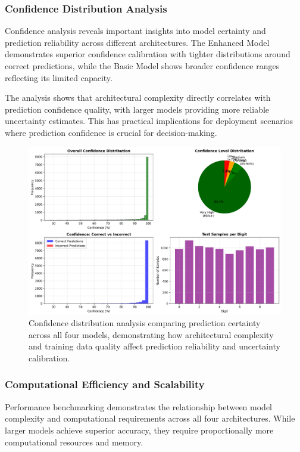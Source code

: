 \documentclass[11pt,a4paper]{report}
\begin{document}
\subsubsection{Confidence Distribution Analysis}

Confidence analysis reveals important insights into model certainty and prediction reliability across different architectures. The Enhanced Model demonstrates superior confidence calibration with tighter distributions around correct predictions, while the Basic Model shows broader confidence ranges reflecting its limited capacity.

The analysis shows that architectural complexity directly correlates with prediction confidence quality, with larger models providing more reliable uncertainty estimates. This has practical implications for deployment scenarios where prediction confidence is crucial for decision-making.

\begin{figure}[H]
\centering
\includegraphics[width=\textwidth]{confidence_analysis.png}
\caption{Confidence distribution analysis comparing prediction certainty across all four models, demonstrating how architectural complexity and training data quality affect prediction reliability and uncertainty calibration.}
\label{fig:confidence_analysis}
\end{figure}

\subsubsection{Computational Efficiency and Scalability}

Performance benchmarking demonstrates the relationship between model complexity and computational requirements across all four architectures. While larger models achieve superior accuracy, they require proportionally more computational resources and memory.
\end{document}
